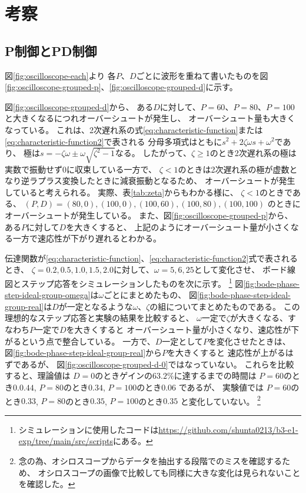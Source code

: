 \documentclass[../../../main]{subfiles}
\begin{document}
\section{考察}\label{sec:consideration}

\subsection{P制御とPD制御}

図\ref{fig:oscilloscope-each}より
各$P$、$D$ごとに波形を重ねて書いたものを図\ref{fig:oscilloscope-grouped-p}、\ref{fig:oscilloscope-grouped-d}に示す。


図\ref{fig:oscilloscope-grouped-d}から、
ある$D$に対して、$P=60$、$P=80$、$P=100$と大きくなるにつれオーバーシュートが発生し、
オーバーシュート量も大きくなっている。
これは、2次遅れ系の式\ref{eq:characteristic-function}または\ref{eq:characteristic-function2}で表される
分母多項式はともに$s^2+2\zeta\omega s+\omega^2$であり、
極は$s=-\zeta\omega \pm \omega \sqrt{\zeta^2-1}$なる。
したがって、$\zeta\geq1$のとき2次遅れ系の極は実数で振動せず0に収束している一方で、
$\zeta<1$のときは2次遅れ系の極が虚数となり逆ラプラス変換したときに減衰振動となるため、
オーバーシュートが発生していると考えられる。
実際、表\ref{tab:zeta}からもわかる様に、
$\zeta<1$のときである、
$(P, D) = (80, 0), (100, 0), (100, 60), (100, 80), (100, 100)$
のときにオーバーシュートが発生している。
また、図\ref{fig:oscilloscope-grouped-p}から、
ある$P$に対して$D$を大きくすると、
上記のようにオーバーシュート量が小さくなる一方で速応性が下がり遅れるとわかる。


伝達関数が\ref{eq:characteristic-function}、\ref{eq:characteristic-function2}式で表されるとき、
$\zeta=0.2, 0.5, 1.0, 1.5, 2.0$に対して、$\omega=5, 6, 25$として変化させ、
ボード線図とステップ応答をシミュレーションしたものを次に示す。
\footnote{
	シミュレーションに使用したコードは\url{https://github.com/shunta0213/b3-e1-exp/tree/main/src/scripts}にある。
}
図\ref{fig:bode-phase-step-ideal-group-omega}は$\omega$ごとにまとめたもの、
図\ref{fig:bode-phase-step-ideal-group-real}は$D$が一定となるような$\omega$、$\zeta$の組についてまとめたものである。
この理想的なステップ応答と実験の結果を比較すると、
$\omega$一定で$\zeta$が大きくなる、すなわち$P$一定で$D$を大きくすると
オーバーシュート量が小さくなり、速応性が下がるという点で整合している。
一方で、$D$一定として$P$を変化させたときは、
図\ref{fig:bode-phase-step-ideal-group-real}から$P$を大きくすると
速応性が上がるはずであるが、
図\ref{fig:oscilloscope-grouped-d-0}ではなっていない。
これらを比較すると、理論値は
$D=0$のときゲインの$63.2\%$に達するまでの時間は
$P=60$のとき$0.0.44$,
$P=80$のとき$0.34$,
$P=100$のとき$0.06$
であるが、
実験値では
$P=60$のとき$0.33$,
$P=80$のとき$0.35$,
$P=100$のとき$0.35$
と変化していない。
\footnote{
	念の為、オシロスコープからデータを抽出する段階でのミスを確認するため、
	オシロスコープの画像で比較しても同様に大きな変化は見られないことを確認した。
}








\end{document}
